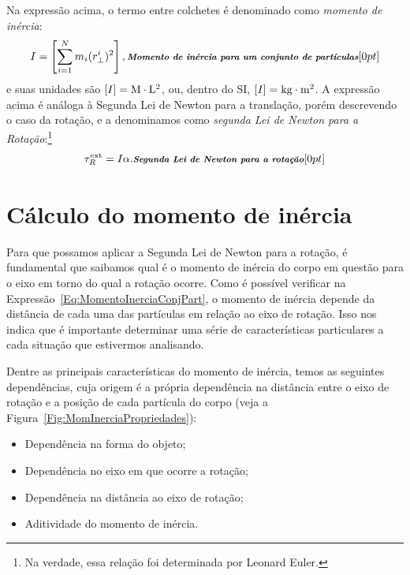 Na expressão acima, o termo entre colchetes é denominado como \emph{momento de inércia}:
\begin{equation}\label{Eq:MomentoInerciaConjPart}
    I = \left[\sum_{i = 1}^N m_i (r_\perp^i)^2\right], \relax{\footnotesize\emph{\textbf{Momento de inércia para um conjunto de partículas}}}[0pt]
\end{equation}
%
e suas unidades são $[I] = \rm{M}\cdot\rm{L}^2$, ou, dentro do SI, $[I] = \rm{kg}\cdot\rm{m}^2$. A expressão acima é análoga à Segunda Lei de Newton para a translação, porém descrevendo o caso da rotação, e a denominamos como \emph{segunda Lei de Newton para a Rotação}:\footnote[][-5mm]{Na verdade, essa relação foi determinada por Leonard Euler.}
\begin{equation}
    \tau_R^{\rm{ext}} = I \alpha. \relax{\footnotesize\emph{\textbf{Segunda Lei de Newton para a rotação}}}[0pt]
\end{equation}

\section{Cálculo do momento de inércia}

Para que possamos aplicar a Segunda Lei de Newton para a rotação, é fundamental que saibamos qual é o momento de inércia do corpo em questão para o eixo em torno do qual a rotação ocorre. Como é possível verificar na Expressão~\ref{Eq:MomentoInerciaConjPart}, o momento de inércia depende da distância de cada uma das partículas em relação ao eixo de rotação. Isso nos indica que é importante determinar uma série de características particulares a cada situação que estivermos analisando.

Dentre as principais características do momento de inércia, temos as seguintes dependências, cuja origem é a própria dependência na distância entre o eixo de rotação e a posição de cada partícula do corpo (veja a Figura~\ref{Fig:MomInerciaPropriedades}):
\begin{itemize}
    \item Dependência na forma do objeto;
    \item Dependência no eixo em que ocorre a rotação;
    \item Dependência na distância ao eixo de rotação;
    \item Aditividade do momento de inércia.
\end{itemize}

